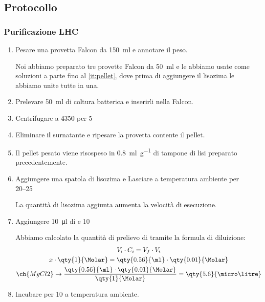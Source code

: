 \subsection{Protocollo}

\subsubsection{Purificazione LHC}
\begin{enumerate}
	\item Pesare una provetta Falcon da \qty{150}{\ml} e annotare il peso.
	      \begin{Note}
		      Noi abbiamo preparato tre provette Falcon da \qty{50}{\ml} e le abbiamo usate come soluzioni a parte fino al \autoref{it:pellet}, dove prima di aggiungere il lisozima le abbiamo unite tutte in una.
	      \end{Note}
	\item Prelevare \qty{50}{\ml} di coltura batterica e inserirli nella Falcon.
	\item Centrifugare a \qty{4350}{\giri} per \qty{5}{\min}
	\item Eliminare il surnatante e ripesare la provetta contente il pellet.
	\item \label{it:pellet} Il pellet pesato viene risospeso in \qty{0.8}{\ml\per\g} di tampone di lisi preparato precedentemente.
	\item Aggiungere una spatola di lisozima e Lasciare a temperatura ambiente per \qtyrange{20}{25}{\min}
	      \begin{Informazione}
		      La quantità di lisozima aggiunta aumenta la velocità di esecuzione.
	      \end{Informazione}
	\item Aggiungere \qty{10}{\micro\litre} di  e \qty{10}{\milli\Molar} 
	      \begin{myBox}
		      Abbiamo calcolato la quantità di prelievo di  tramite la formula di diluizione:
		      \begin{gather*}
			      V_i \cdot C_i = V_f \cdot V_i \\
			      x \cdot \qty{1}{\Molar}= \qty{0.56}{\ml} \cdot \qty{0.01}{\Molar}\\
			      \ch{MgCl2} \rightarrow \frac{\qty{0.56}{\ml} \cdot \qty{0.01}{\Molar}}{\qty{1}{\Molar}} = \qty{5.6}{\micro\litre}
		      \end{gather*}
	      \end{myBox}
	\item Incubare per \qty{10}{\min} a temperatura ambiente.

\end{enumerate}
